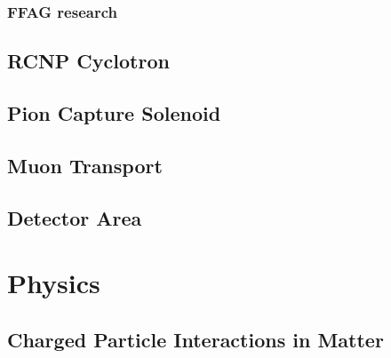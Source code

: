 \subsection{FFAG research} %
\label{sub:ffag_research}

\section{RCNP Cyclotron} %
\label{sec:rcnp_cyclotron}

\section{Pion Capture Solenoid} %
\label{sec:pion_capture_solenoid}

\section{Muon Transport} %
\label{sec:muon_transport}

\section{Detector Area} %
\label{sec:detector_area}

\chapter{Physics} %
\label{cha:physics}
\section{Charged Particle Interactions in Matter} %
\label{sec:charged_particle_interactions_in_matter}
